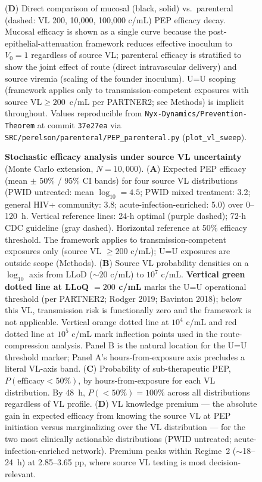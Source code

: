 \documentclass[10pt,letterpaper]{article}
\theoremstyle{definition}
\theoremstyle{remark}
\begin{document}
\begin{figure}[!ht]
{(\textbf{D}) Direct comparison of mucosal (black, solid) vs.\ parenteral (dashed: VL 200, 10{,}000, 100{,}000 c/mL) PEP efficacy decay. Mucosal efficacy is shown as a single curve because the post-epithelial-attenuation framework reduces effective inoculum to $V_{0} = 1$ regardless of source VL; parenteral efficacy is stratified to show the joint effect of route (direct intravascular delivery) and source viremia (scaling of the founder inoculum). U=U scoping (framework applies only to transmission-competent exposures with source $\text{VL} \geq 200$~c/mL per PARTNER2; see Methods) is implicit throughout.
Values reproducible from \texttt{Nyx-Dynamics/Prevention-Theorem} at commit \texttt{37e27ea} via \texttt{SRC/perelson/parenteral/PEP\_parenteral.py} (\texttt{plot\_vl\_sweep}).}
\label{fig:route}
\end{figure}

\begin{figure}[!ht]
\centering
\caption{\textbf{Stochastic efficacy analysis under source VL uncertainty} (Monte Carlo extension, $N = 10{,}000$).
(\textbf{A}) Expected PEP efficacy (mean $\pm$ 50\% / 95\% CI bands) for four source VL distributions (PWID untreated: mean $\log_{10} = 4.5$; PWID mixed treatment: 3.2; general HIV+ community: 3.8; acute-infection-enriched: 5.0) over 0--120~h. Vertical reference lines: 24-h optimal (purple dashed); 72-h CDC guideline (gray dashed). Horizontal reference at 50\% efficacy threshold. The framework applies to transmission-competent exposures only (source VL $\geq 200$ c/mL); U=U exposures are outside scope (Methods).
(\textbf{B}) Source VL probability densities on a $\log_{10}$ axis from LLoD ($\sim 20$ c/mL) to $10^{7}$ c/mL. \textbf{Vertical green dotted line at LLoQ $= 200$ c/mL} marks the U=U operational threshold (per PARTNER2; Rodger 2019; Bavinton 2018); below this VL, transmission risk is functionally zero and the framework is not applicable. Vertical orange dotted line at $10^{4}$ c/mL and red dotted line at $10^{5}$ c/mL mark inflection points used in the route-compression analysis. Panel B is the natural location for the U=U threshold marker; Panel A's hours-from-exposure axis precludes a literal VL-axis band.
(\textbf{C}) Probability of sub-therapeutic PEP, $P(\text{efficacy} < 50\%)$, by hours-from-exposure for each VL distribution. By 48~h, $P(<50\%) = 100\%$ across all distributions regardless of VL profile.
(\textbf{D}) VL knowledge premium --- the absolute gain in expected efficacy from knowing the source VL at PEP initiation versus marginalizing over the VL distribution --- for the two most clinically actionable distributions (PWID untreated; acute-infection-enriched network). Premium peaks within Regime~2 ($\sim$18--24~h) at 2.85--3.65 pp, where source VL testing is most decision-relevant.}
\label{fig:stochastic}
\end{figure}
\end{document}
